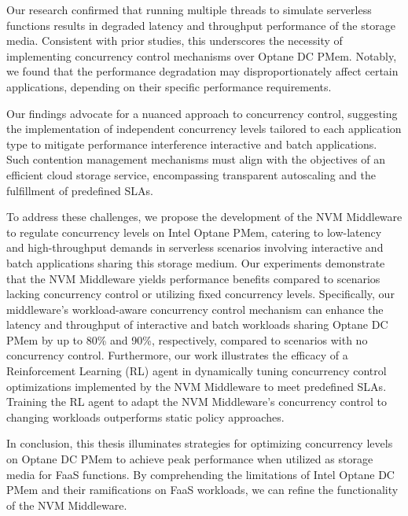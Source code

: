 Our research confirmed that running multiple threads to simulate serverless functions results in degraded latency and throughput performance of the storage media. Consistent with prior studies, this underscores the necessity of implementing concurrency control mechanisms over Optane DC PMem. Notably, we found that the performance degradation may disproportionately affect certain applications, depending on their specific performance requirements.

Our findings advocate for a nuanced approach to concurrency control, suggesting the implementation of independent concurrency levels tailored to each application type to mitigate performance interference interactive and batch applications. Such contention management mechanisms must align with the objectives of an efficient cloud storage service, encompassing transparent autoscaling and the fulfillment of predefined SLAs.

To address these challenges, we propose the development of the NVM Middleware to regulate concurrency levels on Intel Optane PMem, catering to low-latency and high-throughput demands in serverless scenarios involving interactive and batch applications sharing this storage medium. Our experiments demonstrate that the NVM Middleware yields performance benefits compared to scenarios lacking concurrency control or utilizing fixed concurrency levels. Specifically, our middleware's workload-aware concurrency control mechanism can enhance the latency and throughput of interactive and batch workloads sharing Optane DC PMem by up to 80\% and 90\%, respectively, compared to scenarios with no concurrency control. Furthermore, our work illustrates the efficacy of a Reinforcement Learning (RL) agent in dynamically tuning concurrency control optimizations implemented by the NVM Middleware to meet predefined SLAs. Training the RL agent to adapt the NVM Middleware's concurrency control to changing workloads outperforms static policy approaches.

In conclusion, this thesis illuminates strategies for optimizing concurrency levels on Optane DC PMem to achieve peak performance when utilized as storage media for FaaS functions. By comprehending the limitations of Intel Optane DC PMem and their ramifications on FaaS workloads, we can refine the functionality of the NVM Middleware.